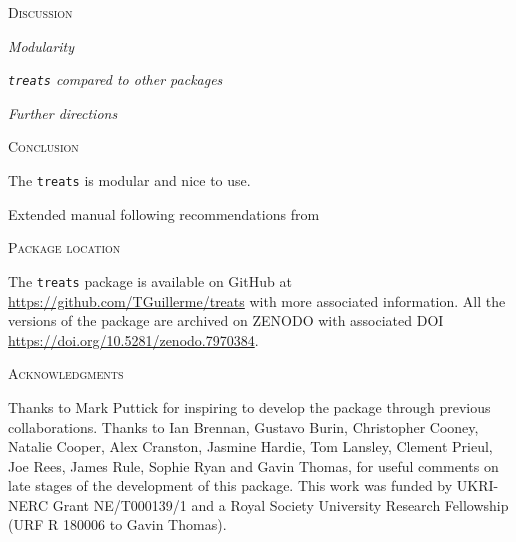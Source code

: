\documentclass[12pt,letterpaper]{article}
\renewcommand{\section}[1]{%
\bigskip
\begin{center}
\begin{Large}
\normalfont\scshape #1
\medskip
\end{Large}
\end{center}}
\renewcommand{\subsection}[1]{%
\bigskip
\begin{center}
\begin{large}
\normalfont\itshape #1
\end{large}
\end{center}}
\newcommand{\treats}{\texttt{treats} }
\begin{document}
\section{Discussion}

\subsection{Modularity}

\subsection{\treats compared to other packages}

\subsection{Further directions}


\section{Conclusion}
The \treats is modular and nice to use.

Extended manual following recommendations from \cite{cooper2016dark}


\section{Package location}
The \treats package is available 
on GitHub at \url{https://github.com/TGuillerme/treats} with more associated information.
All the versions of the package are archived on ZENODO with associated DOI \url{https://doi.org/10.5281/zenodo.7970384}.

\section{Acknowledgments}
Thanks to Mark Puttick for inspiring to develop the package through previous collaborations. Thanks to Ian Brennan, Gustavo Burin, Christopher Cooney, Natalie Cooper, Alex Cranston, Jasmine Hardie, Tom Lansley, Clement Prieul, Joe Rees, James Rule, Sophie Ryan and Gavin Thomas, for useful comments on late stages of the development of this package. This work was funded by UKRI-NERC Grant NE/T000139/1 and a Royal Society University Research Fellowship (URF R 180006 to Gavin Thomas).



\end{document}
